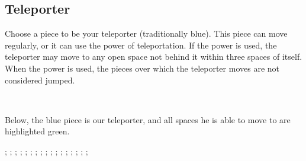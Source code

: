 

\subsection*{Teleporter}

Choose a piece to be your teleporter (traditionally blue).
This piece can move regularly, or it can use the power of teleportation.
If the power is used, the teleporter may move to any open space not behind it within three spaces of itself.
When the power is used, the pieces over which the teleporter moves are not considered jumped.

\

Below, the blue piece is our teleporter, and all spaces he is able to move to are highlighted green.

\begin{struggleboard}
  ;
  ;
  ;
  ;
  ;
  ;
  ;
  ;
  ;
  ;
  ;
  ;
  ;
  ;
  ;
  ;
  ;
\end{struggleboard}
